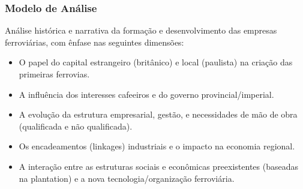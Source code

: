 \documentclass[12pt]{article}
\begin{document}
\subsubsection*{Modelo de Análise}
Análise histórica e narrativa da formação e desenvolvimento das empresas ferroviárias, com ênfase nas seguintes dimensões:
\begin{itemize}
    \item O papel do capital estrangeiro (britânico) e local (paulista) na criação das primeiras ferrovias.
    \item A influência dos interesses cafeeiros e do governo provincial/imperial.
    \item A evolução da estrutura empresarial, gestão, e necessidades de mão de obra (qualificada e não qualificada).
    \item Os encadeamentos (linkages) industriais e o impacto na economia regional.
    \item A interação entre as estruturas sociais e econômicas preexistentes (baseadas na plantation) e a nova tecnologia/organização ferroviária.
\end{itemize}
\end{document}
